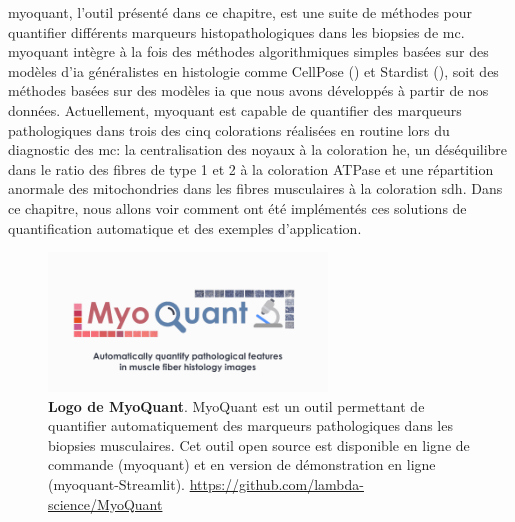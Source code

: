 \gls{myoquant}, l'outil présenté dans ce chapitre, est une suite de méthodes pour quantifier différents marqueurs histopathologiques dans les biopsies de \gls{mc}. \gls{myoquant} intègre à la fois des méthodes algorithmiques simples basées sur des modèles d'\gls{ia} généralistes en histologie comme CellPose (\cite{stringer_cellpose_2021}) et Stardist (\cite{weigert_star-convex_2020}), soit des méthodes basées sur des modèles \gls{ia} que nous avons développés à partir de nos données. Actuellement, \gls{myoquant} est capable de quantifier des marqueurs pathologiques dans trois des cinq colorations réalisées en routine lors du diagnostic des \gls{mc}: la centralisation des noyaux à la coloration \gls{he}, un déséquilibre dans le ratio des fibres de type 1 et 2 à la coloration ATPase et une répartition anormale des mitochondries dans les fibres musculaires à la coloration \gls{sdh}. Dans ce chapitre, nous allons voir comment ont été implémentés ces solutions de quantification automatique et des exemples d'application.

\begin{figure}[!ht]
 \centering
 \includegraphics[width=0.66\textwidth]{figures/myoquant_logo.png}
 \caption[Logo MyoQuant]{\textbf{Logo de MyoQuant}. MyoQuant est un outil permettant de quantifier automatiquement des marqueurs pathologiques dans les biopsies musculaires. Cet outil open source est disponible en ligne de commande (\gls{myoquant}) et en version de démonstration en ligne (\gls{myoquant}-Streamlit). \url{https://github.com/lambda-science/MyoQuant}}
 \label{fig:myoquant_logo}
\end{figure}

